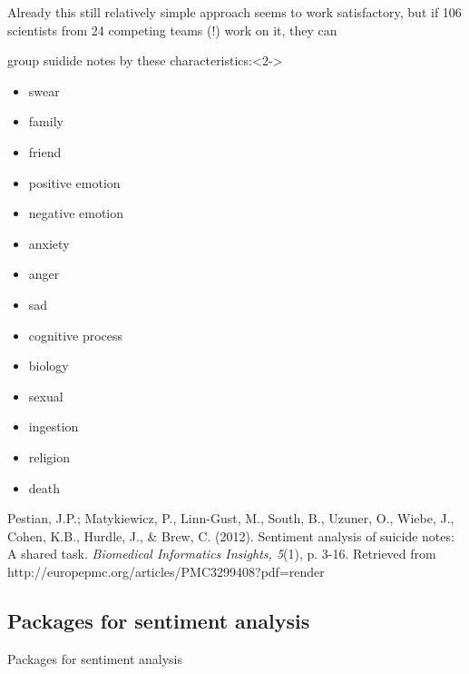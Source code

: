 \documentclass{beamer}
\begin{document}
\begin{frame}{}
Already this still relatively simple approach seems to work satisfactory, but if 106 scientists from 24 competing teams (!) work on it, they can 
\begin{block}{group suidide notes by these characteristics:}<2->
\begin{multicols}{2}
{\small {
\begin{itemize}
\item swear
\item family
\item friend
\item positive emotion
\item negative emotion
\item anxiety
\item anger
\item sad
\item cognitive process
\item biology
\item sexual
\item ingestion
\item religion
\item death
\end{itemize}
}}
\end{multicols}
\end{block}
\par
\tiny{Pestian, J.P.; Matykiewicz, P., Linn-Gust, M., South, B., Uzuner, O., Wiebe, J., Cohen, K.B., Hurdle, J., \& Brew, C. (2012). Sentiment analysis of suicide notes: A shared task. \emph{Biomedical Informatics Insights, 5}(1), p. 3-16. Retrieved from http://europepmc.org/articles/PMC3299408?pdf=render}\\
\end{frame}



\subsection{Packages for sentiment analysis}

\begin{frame}[plain]
Packages for sentiment analysis
\end{frame}
\end{document}
